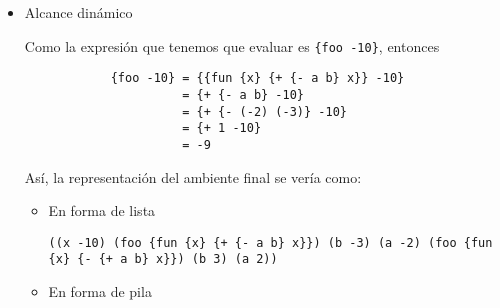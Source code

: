 \documentclass[letterpaper,11pt]{article}
\begin{document}
\begin{enumerate}
\begin{enumerate}
\begin{itemize}
            \begin{center}
            \begin{drawstack}[scale=1.45]
            \end{drawstack}
            \end{center}
        
            \item Alcance dinámico

            Como la expresión que tenemos que evaluar es \texttt{\{foo -10\}}, 
            entonces 
            \begin{verbatim}
            {foo -10} = {{fun {x} {+ {- a b} x}} -10}
                      = {+ {- a b} -10}
                      = {+ {- (-2) (-3)} -10}
                      = {+ 1 -10}
                      = -9
            \end{verbatim}

            Así, la representación del ambiente final se vería como:
            \begin{itemize}
                \item En forma de lista
                \begin{center}
                    \texttt{((x -10) (foo \{fun \{x\} \{+ \{- a b\} x\}\}) 
                            (b -3) (a -2) (foo \{fun \{x\} \{- \{+ a b\} x\}\}) 
                            (b 3) (a 2))}
                \end{center}

                \newpage
                \item En forma de pila 
                \begin{center}
                \begin{drawstack}[scale=1.45]
                \end{drawstack}
                \end{center}
            \end{itemize}
        \end{itemize}
        

\end{enumerate}
\end{enumerate}
\end{document}
